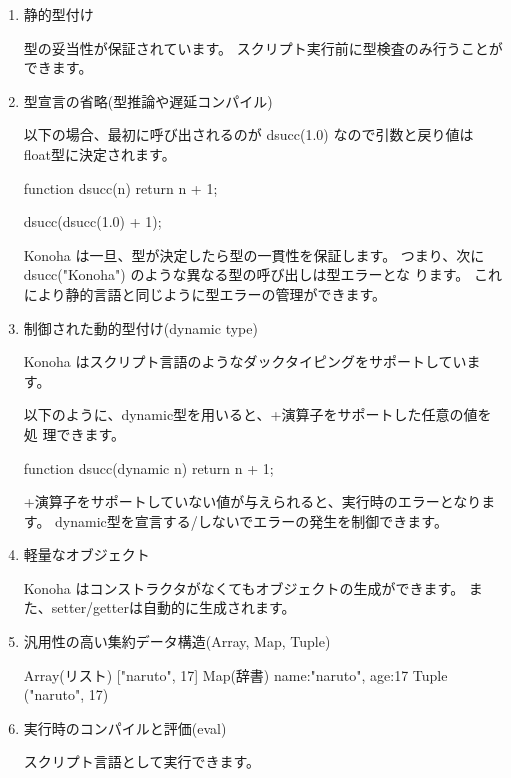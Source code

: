 \documentclass[mingoth,a4paper]{jsarticle}
\begin{document}
\begin{enumerate}
\item 静的型付け

型の妥当性が保証されています。
スクリプト実行前に型検査のみ行うことができます。

\item 型宣言の省略(型推論や遅延コンパイル)

以下の場合、最初に呼び出されるのが dsucc(1.0) なので引数と戻り値は
float型に決定されます。

\begin{commandline}
function dsucc(n) {
  return n + 1;
}

dsucc(dsucc(1.0) + 1);
\end{commandline}

Konoha は一旦、型が決定したら型の一貫性を保証します。
つまり、次に dsucc("Konoha") のような異なる型の呼び出しは型エラーとな
ります。
これにより静的言語と同じように型エラーの管理ができます。
\\
\item 制御された動的型付け(dynamic type)

Konoha はスクリプト言語のようなダックタイピングをサポートしています。

以下のように、dynamic型を用いると、+演算子をサポートした任意の値を処
理できます。

\begin{commandline}
function dsucc(dynamic n) {
  return n + 1;
}
\end{commandline}

+演算子をサポートしていない値が与えられると、実行時のエラーとなります。
dynamic型を宣言する/しないでエラーの発生を制御できます。
\\
\item 軽量なオブジェクト

Konoha はコンストラクタがなくてもオブジェクトの生成ができます。
また、setter/getterは自動的に生成されます。
\\
\item 汎用性の高い集約データ構造(Array, Map, Tuple)

\begin{commandline}
  Array(リスト)   ["naruto", 17]
  Map(辞書)       {name:"naruto", age:17}
  Tuple          ("naruto", 17)
\end{commandline}

\item 実行時のコンパイルと評価(eval)

スクリプト言語として実行できます。


\end{enumerate}
\end{document}

